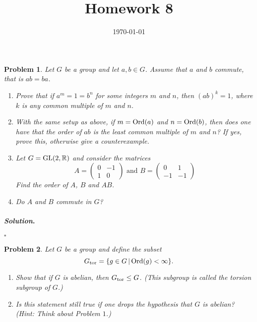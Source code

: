 \documentclass[reqno]{amsart}
\theoremstyle{plain}
\newtheorem{problem}{Problem}
\theoremstyle{definition}
\newenvironment{solution}{\paragraph{\emph{Solution}.}}{\hfill$\square$}
\begin{document}
 

\title[Homework 8]{Homework 8}

\date{\today} 
\maketitle 

\begin{problem}
Let $G$ be a group and let $a, b \in G$.  Assume that $a$ and $b$ commute, that is $ab = ba$.  
\begin{enumerate}
\item Prove that if $a^{m} = 1 = b^{n}$ for some integers $m$ and $n$, then $(ab)^{k} = 1$, where $k$ is any common multiple of $m$ and $n$.
\item With the same setup as above, if $m ={\rm Ord}(a)$ and $n = {\rm Ord}(b)$, then does one have that the order of $ab$ is the least common multiple of $m$ and $n$?  If yes, prove this, otherwise give a counterexample.
\item Let $G = {\rm GL}(2,\mathbb{R})$ and consider the matrices
\begin{equation*}
A =
\begin{pmatrix}
0 & -1 \\ 1 & 0
\end{pmatrix}
\text{ and }
B=
\begin{pmatrix}
0 & 1 \\ -1 & -1
\end{pmatrix}
\end{equation*}
Find the order of $A$, $B$ and $AB$.
\item Do $A$ and $B$ commute in $G$?
\end{enumerate}
\end{problem}

\begin{solution}

\end{solution}

\begin{problem}
Let $G$ be a group and define the subset
$$G_{{\rm tor}} = \{g \in G \, | \, {\rm Ord}(g) < \infty \}. $$
\begin{enumerate}
\item Show that if $G$ is abelian, then $G_{{\rm tor}} \le G$.  (This subgroup is called the torsion subgroup of $G$.)
\item Is this statement still true if one drops the hypothesis that $G$ is abelian?  (Hint:  Think about Problem $1$.)
\end{enumerate}
\end{problem}
\end{document}
